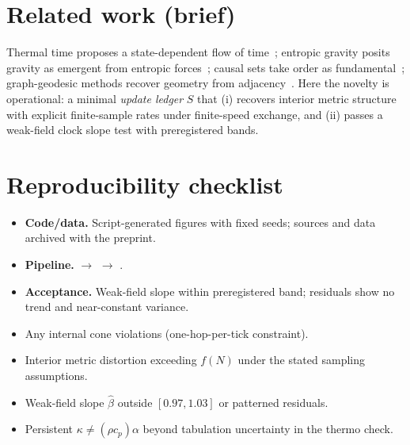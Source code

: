 \documentclass[11pt,a4paper]{article}
\begin{document}
\section*{Related work (brief)}
Thermal time proposes a state-dependent flow of time~\cite{Rovelli1993,Rovelli2011}; entropic gravity posits gravity as emergent from entropic forces~\cite{Verlinde2011}; causal sets take order as fundamental~\cite{Bombelli1987}; graph-geodesic methods recover geometry from adjacency~\cite{Tenenbaum2000}. Here the novelty is operational: a minimal \emph{update ledger} $S$ that (i) recovers interior metric structure with explicit finite-sample rates under finite-speed exchange, and (ii) passes a weak-field clock slope test with preregistered bands.

\section*{Reproducibility checklist}
\begin{itemize}
  \item \textbf{Code/data.} Script-generated figures with fixed seeds; sources and data archived with the preprint.
  \item \textbf{Pipeline.}  $\rightarrow$  $\rightarrow$ .
  \item \textbf{Acceptance.} Weak-field slope within preregistered band; residuals show no trend and near-constant variance.
\end{itemize}

\begin{tcolorbox}[title=Falsifiers (pre-registered)]
\begin{itemize}
  \item Any internal cone violations (one-hop-per-tick constraint).
  \item Interior metric distortion exceeding $f(N)$ under the stated sampling assumptions.
  \item Weak-field slope $\hat\beta$ outside $[0.97,1.03]$ or patterned residuals.
  \item Persistent $\kappa \neq (\rho c_p)\alpha$ beyond tabulation uncertainty in the thermo check.
\end{itemize}
\end{tcolorbox}

\ifwithglossary
  \printglossary[type=\acronymtype,title={Acronyms}]
  \printglossary[title={Glossary}]
\fi

\ifshowbib
  \nocite{*} %
  \printbibliography
\fi
\end{document}
